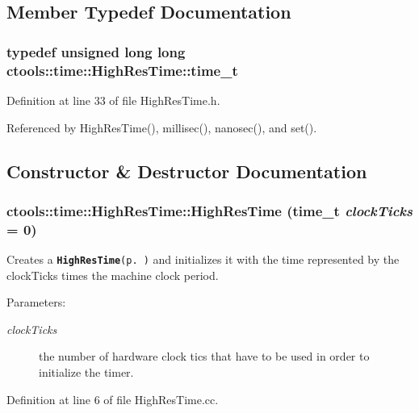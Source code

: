 \subsection{Member Typedef Documentation}
\subsubsection{\setlength{\rightskip}{0pt plus 5cm}typedef unsigned long long {\bf ctools::time::High\-Res\-Time::time\_\-t}}\label{classctools_1_1time_1_1HighResTime_w0}




Definition at line 33 of file High\-Res\-Time.h.

Referenced by High\-Res\-Time(), millisec(), nanosec(), and set().

\subsection{Constructor \& Destructor Documentation}
\subsubsection{\setlength{\rightskip}{0pt plus 5cm}ctools::time::High\-Res\-Time::High\-Res\-Time ({\bf time\_\-t} {\em clock\-Ticks} = 0)\hspace{0.3cm}{\tt  [explicit]}}\label{classctools_1_1time_1_1HighResTime_a0}


Creates a {\tt {\bf High\-Res\-Time}{\rm (p.\,\pageref{classctools_1_1time_1_1HighResTime})}} and initializes it with the time represented by the clock\-Ticks times the machine clock period. 

\begin{Desc}
\item[Parameters:]
\begin{description}
\item[{\em clock\-Ticks}]the number of hardware clock tics that have to be used in order to initialize the timer. \end{description}
\end{Desc}


Definition at line 6 of file High\-Res\-Time.cc.

